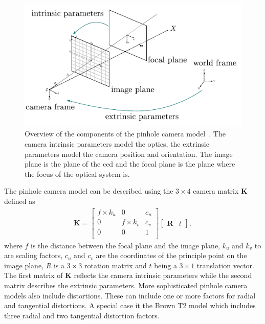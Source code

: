 \begin{figure}[htb]
    \centering
    \includegraphics[width=\textwidth]{doc/thesis/0_figures/sfm/pinholeCamera.png}
    \caption{Overview of the components of the pinhole camera model~\cite{openMVG}. The camera intrinsic parameters model the optics, the extrinsic parameters model the camera position and orientation. The image plane is the plane of the \gls{ccd} and the focal plane is the plane where the focus of the optical system is.}
    \label{fig:pinhole_cam}
\end{figure} 

The pinhole camera model can be described using the $3\times4$ camera matrix $\textbf{K}$ defined as
\begin{align}
    \textbf{K} = \begin{bmatrix}
        f\times k_u & 0           & c_u \\
        0           & f\times k_v & c_v \\
        0           & 0           & 1   \\
    \end{bmatrix} 
    \begin{bmatrix}
        \textbf{R} & t
    \end{bmatrix}, \label{eq:camera_m}
\end{align}
where $f$ is the distance between the focal plane and the image plane, $k_u$ and $k_v$ to are scaling factors, $c_u$ and $c_v$ are the coordinates of the principle point on the image plane, $R$ is a $3\times3$ rotation matrix and $t$ being a $3\times1$ translation vector. The first matrix of $\textbf{K}$ reflects the camera intrinsic parameters while the second matrix describes the extrinsic parameters.
More sophisticated pinhole camera models also include distortions. These can include one or more factors for radial and tangential distortions. A special case it the Brown T2 model which includes three radial and two tangential distortion factors.

